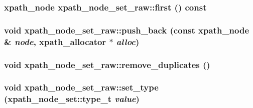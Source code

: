 \label{classxpath__node__set__raw_a6be07e8a83744082cf106d4611da0164}
\hypertarget{classxpath__node__set__raw_ac6d6a4e637df45137d7cb6c925230830}{
\subsubsection[{first}]{\setlength{\rightskip}{0pt plus 5cm}xpath\_\-node xpath\_\-node\_\-set\_\-raw::first () const}}
\label{classxpath__node__set__raw_ac6d6a4e637df45137d7cb6c925230830}
\hypertarget{classxpath__node__set__raw_a676ec123e5be874869c78ff5c43ae9c2}{
\subsubsection[{push\_\-back}]{\setlength{\rightskip}{0pt plus 5cm}void xpath\_\-node\_\-set\_\-raw::push\_\-back (const xpath\_\-node \& {\em node}, \/  {\bf xpath\_\-allocator} $\ast$ {\em alloc})}}
\label{classxpath__node__set__raw_a676ec123e5be874869c78ff5c43ae9c2}
\hypertarget{classxpath__node__set__raw_af82da6fa8d42f9dff9c55e7b93d96e26}{
\subsubsection[{remove\_\-duplicates}]{\setlength{\rightskip}{0pt plus 5cm}void xpath\_\-node\_\-set\_\-raw::remove\_\-duplicates ()}}
\label{classxpath__node__set__raw_af82da6fa8d42f9dff9c55e7b93d96e26}
\hypertarget{classxpath__node__set__raw_ae73780271d772967f78ddd7b9376cdab}{
\subsubsection[{set\_\-type}]{\setlength{\rightskip}{0pt plus 5cm}void xpath\_\-node\_\-set\_\-raw::set\_\-type (xpath\_\-node\_\-set::type\_\-t {\em value})}}
